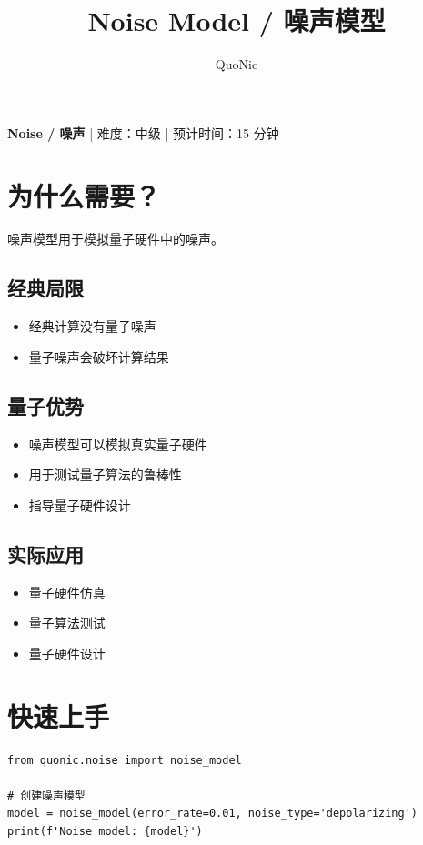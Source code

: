 \documentclass[12pt,a4paper]{article}
\title{Noise Model / 噪声模型}
\author{QuoNic}
\date{}
\begin{document}
\maketitle

\begin{center}
\textbf{Noise / 噪声} | 难度：中级 | 预计时间：15 分钟
\end{center}

\tableofcontents
\newpage

\section{为什么需要？}

噪声模型用于模拟量子硬件中的噪声。

\subsection{经典局限}
\begin{itemize}
  \item 经典计算没有量子噪声
  \item 量子噪声会破坏计算结果
\end{itemize}

\subsection{量子优势}
\begin{itemize}
  \item 噪声模型可以模拟真实量子硬件
  \item 用于测试量子算法的鲁棒性
  \item 指导量子硬件设计
\end{itemize}

\subsection{实际应用}
\begin{itemize}
  \item 量子硬件仿真
  \item 量子算法测试
  \item 量子硬件设计
\end{itemize}

\section{快速上手}

\begin{verbatim}
from quonic.noise import noise_model

# 创建噪声模型
model = noise_model(error_rate=0.01, noise_type='depolarizing')
print(f'Noise model: {model}')
\end{verbatim}
\end{document}
